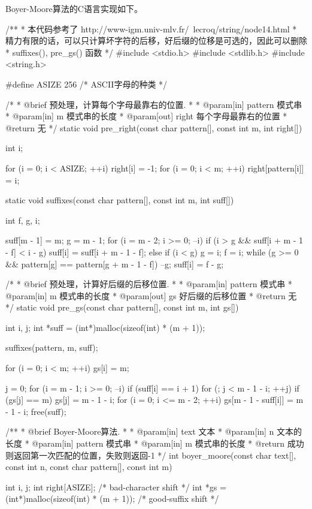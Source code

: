 Boyer-Moore算法的C语言实现如下。
\begin{Codex}[label=boyer_moore.c]
/**
 * 本代码参考了 http://www-igm.univ-mlv.fr/~lecroq/string/node14.html
 * 精力有限的话，可以只计算坏字符的后移，好后缀的位移是可选的，因此可以删除
 * suffixes(), pre_gs() 函数
 */
#include <stdio.h>
#include <stdlib.h>
#include <string.h>

#define ASIZE 256  /* ASCII字母的种类 */

/*
 * @brief 预处理，计算每个字母最靠右的位置.
 *
 * @param[in] pattern 模式串
 * @param[in] m 模式串的长度
 * @param[out] right 每个字母最靠右的位置
 * @return 无
 */
static void pre_right(const char pattern[], const int m, int right[]) {
    int i;

    for (i = 0; i < ASIZE; ++i) right[i] = -1;
    for (i = 0; i < m; ++i) right[pattern[i]] = i;
}


static void suffixes(const char pattern[], const int m, int suff[]) {
    int f, g, i;

    suff[m - 1] = m;
    g = m - 1;
    for (i = m - 2; i >= 0; --i) {
        if (i > g && suff[i + m - 1 - f] < i - g)
            suff[i] = suff[i + m - 1 - f];
        else {
            if (i < g)
                g = i;
            f = i;
            while (g >= 0 && pattern[g] == pattern[g + m - 1 - f])
                --g;
            suff[i] = f - g;
        }
    }
}

/*
 * @brief 预处理，计算好后缀的后移位置.
 *
 * @param[in] pattern 模式串
 * @param[in] m 模式串的长度
 * @param[out] gs 好后缀的后移位置
 * @return 无
 */
static void pre_gs(const char pattern[], const int m, int gs[]) {
    int i, j;
    int *suff = (int*)malloc(sizeof(int) * (m + 1));

    suffixes(pattern, m, suff);

    for (i = 0; i < m; ++i) gs[i] = m;

    j = 0;
    for (i = m - 1; i >= 0; --i) if (suff[i] == i + 1)
        for (; j < m - 1 - i; ++j) if (gs[j] == m)
            gs[j] = m - 1 - i;
    for (i = 0; i <= m - 2; ++i) 
        gs[m - 1 - suff[i]] = m - 1 - i;
    free(suff);
}

/**
 * @brief Boyer-Moore算法.
 *
 * @param[in] text 文本
 * @param[in] n 文本的长度
 * @param[in] pattern 模式串
 * @param[in] m 模式串的长度
 * @return 成功则返回第一次匹配的位置，失败则返回-1
 */
int boyer_moore(const char text[], const int n, 
                const char pattern[], const int m) {
    int i, j;
    int right[ASIZE];  /* bad-character shift */
    int *gs = (int*)malloc(sizeof(int) * (m + 1));  /* good-suffix shift */

}
\end{Codex}
